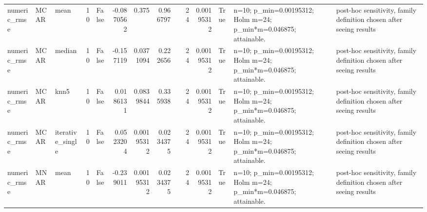 \begin{table}[ht]
\begin{tabular}{lllrlrrrlrrlll}
 numeric\_rmse           & MCAR        & mean             &           10 & False               &      -0.0870562  & 0.375      & 0.966797  &                                                                                                                    &                             24 &                         0.00195312 & True                        & n=10; p\_min=0.00195312; Holm m=24; p\_min*m=0.046875; attainable. & post-hoc sensitivity, family definition chosen after seeing results \\
 numeric\_rmse           & MCAR        & median           &           10 & False               &      -0.157119   & 0.0371094  & 0.222656  &                                                                                                                    &                             24 &                         0.00195312 & True                        & n=10; p\_min=0.00195312; Holm m=24; p\_min*m=0.046875; attainable. & post-hoc sensitivity, family definition chosen after seeing results \\
 numeric\_rmse           & MCAR        & knn5             &           10 & False               &       0.0186131  & 0.0839844  & 0.335938  &                                                                                                                    &                             24 &                         0.00195312 & True                        & n=10; p\_min=0.00195312; Holm m=24; p\_min*m=0.046875; attainable. & post-hoc sensitivity, family definition chosen after seeing results \\
 numeric\_rmse           & MCAR        & iterative\_single &           10 & False               &       0.0523204  & 0.00195312 & 0.0234375 &                                                                                                                    &                             24 &                         0.00195312 & True                        & n=10; p\_min=0.00195312; Holm m=24; p\_min*m=0.046875; attainable. & post-hoc sensitivity, family definition chosen after seeing results \\
 numeric\_rmse           & MNAR        & mean             &           10 & False               &      -0.239011   & 0.00195312 & 0.0234375 &                                                                                                                    &                             24 &                         0.00195312 & True                        & n=10; p\_min=0.00195312; Holm m=24; p\_min*m=0.046875; attainable. & post-hoc sensitivity, family definition chosen after seeing results \\

\end{tabular}
\end{table}
